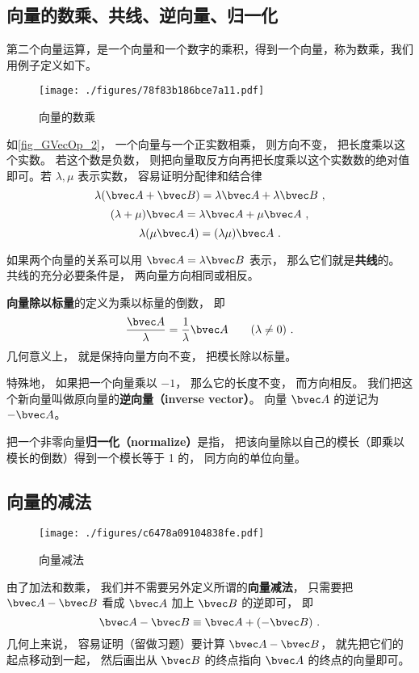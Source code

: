 \subsection{向量的数乘、共线、逆向量、归一化}\label{sub_GVecOp_1}
第二个向量运算，是一个向量和一个数字的乘积，得到一个向量，称为数乘，我们用例子定义如下。

\begin{figure}[ht]
\centering
\texttt{[image: ./figures/78f83b186bce7a11.pdf]}
\caption{向量的数乘} \label{fig_GVecOp_2}
\end{figure}

如\autoref{fig_GVecOp_2}， 一个向量与一个正实数相乘， 则方向不变， 把长度乘以这个实数。 若这个数是负数， 则把向量取反方向再把长度乘以这个实数数的绝对值即可。若 $\lambda, \mu$ 表示实数， 容易证明分配律和结合律
\begin{equation}
\lambda(\bvec A + \bvec B) = \lambda\bvec A + \lambda\bvec B~,
\end{equation}
\begin{equation}
(\lambda+\mu)\bvec A = \lambda\bvec A + \mu\bvec A~,
\end{equation}
\begin{equation}
\lambda(\mu\bvec A) = (\lambda\mu) \bvec A~.
\end{equation}

如果两个向量的关系可以用 $\bvec A = \lambda\bvec B$ 表示， 那么它们就是\textbf{共线}的。 共线的充分必要条件是， 两向量方向相同或相反。

\textbf{向量除以标量}的定义为乘以标量的倒数， 即
\begin{equation}
\frac{\bvec A}{\lambda} = \frac{1}{\lambda} \bvec A \qquad (\lambda \ne 0)~.
\end{equation}
几何意义上， 就是保持向量方向不变， 把模长除以标量。

特殊地， 如果把一个向量乘以 $-1$， 那么它的长度不变， 而方向相反。 我们把这个新向量叫做原向量的\textbf{逆向量（inverse vector）}。 向量 $\bvec A$ 的逆记为 $-\bvec A$。

把一个非零向量\textbf{归一化（normalize）}是指， 把该向量除以自己的模长（即乘以模长的倒数）得到一个模长等于 1 的， 同方向的单位向量。

\subsection{向量的减法}

\begin{figure}[ht]
\centering
\texttt{[image: ./figures/c6478a09104838fe.pdf]}
\caption{向量减法} \label{fig_GVecOp_3}
\end{figure}
由了加法和数乘， 我们并不需要另外定义所谓的\textbf{向量减法}， 只需要把 $\bvec A - \bvec B$ 看成 $\bvec A$ 加上 $\bvec B$ 的逆即可， 即
\begin{equation}
\bvec A - \bvec B \equiv \bvec A + (-\bvec B)~.
\end{equation}
几何上来说， 容易证明（留做习题）要计算 $\bvec A - \bvec B$， 就先把它们的起点移动到一起， 然后画出从 $\bvec B$ 的终点指向 $\bvec A$ 的终点的向量即可。

